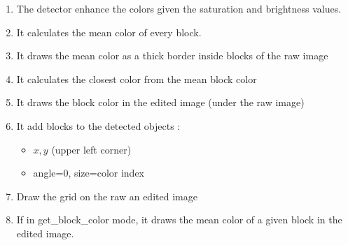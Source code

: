     \begin{enumerate}
        \item The detector enhance the colors given the saturation and 
                brightness values.
        \item It calculates the mean color of every block.
        \item It draws the mean color as a thick border inside blocks of 
            the raw image
        \item It calculates the closest color from the mean block color
        \item It draws the block color in the edited image (under the raw 
            image)


        \item It add blocks to the detected objects :
        \begin{itemize}
            \label{sec:cgd:algo:blockattributs}
            \item $x,y$ (upper left corner)
            \item angle=0, size=color index
        \end{itemize}
        \item Draw the grid on the raw an edited image
        \item If in get\_block\_color mode, it draws the mean color of a 
            given block in the edited image.
    \end{enumerate}


